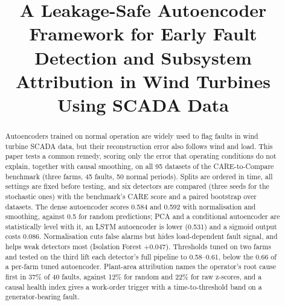 \documentclass[conference]{IEEEtran}
\begin{document}
\title{A Leakage-Safe Autoencoder Framework for Early Fault Detection and Subsystem Attribution in Wind Turbines Using SCADA Data}

\author{
\and
{}
\and
{}
\and
{}
}

\maketitle

\begin{abstract}
Autoencoders trained on normal operation are widely used to flag faults in wind turbine SCADA data, but their reconstruction error also follows wind and load. This paper tests a common remedy, scoring only the error that operating conditions do not explain, together with causal smoothing, on all 95 datasets of the CARE-to-Compare benchmark (three farms, 45 faults, 50 normal periods). Splits are ordered in time, all settings are fixed before testing, and six detectors are compared (three seeds for the stochastic ones) with the benchmark's CARE score and a paired bootstrap over datasets. The dense autoencoder scores 0.584 and 0.592 with normalisation and smoothing, against 0.5 for random predictions; PCA and a conditional autoencoder are statistically level with it, an LSTM autoencoder is lower (0.531) and a sigmoid output costs 0.086. Normalisation cuts false alarms but hides load-dependent fault signal, and helps weak detectors most (Isolation Forest +0.047). Thresholds tuned on two farms and tested on the third lift each detector's full pipeline to 0.58--0.61, below the 0.66 of a per-farm tuned autoencoder. Plant-area attribution names the operator's root cause first in 37\% of 40 faults, against 12\% for random and 22\% for raw z-scores, and a causal health index gives a work-order trigger with a time-to-threshold band on a generator-bearing fault.
\end{abstract}
\end{document}

